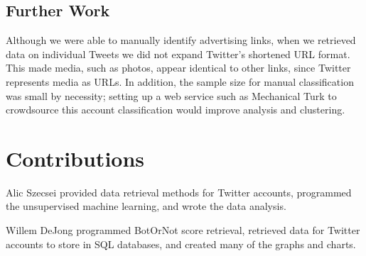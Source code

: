 \documentclass{sig-alternate-05-2015}
\begin{document}
\subsection{Further Work}
Although we were able to manually identify advertising links, when we retrieved data on individual Tweets we did not expand Twitter's shortened URL format. This made media, such as photos, appear identical to other links, since Twitter represents media as URLs. In addition, the sample size for manual classification was small by necessity; setting up a web service such as Mechanical Turk to crowdsource this account classification would improve analysis and clustering.

%

%
%

\appendix
\section{Contributions}
Alic Szecsei provided data retrieval methods for Twitter accounts, programmed the unsupervised machine learning, and wrote the data analysis.

Willem DeJong programmed BotOrNot score retrieval, retrieved data for Twitter accounts to store in SQL databases, and created many of the graphs and charts.

\end{document}
